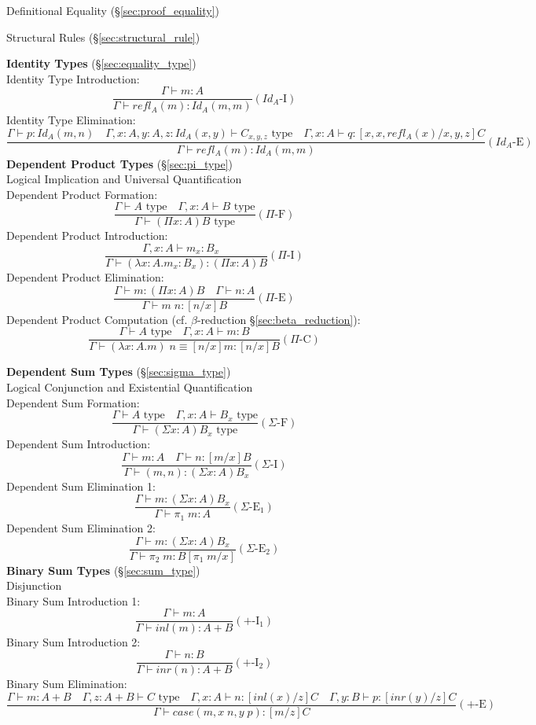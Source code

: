 Definitional Equality (\S\ref{sec:proof_equality})

Structural Rules (\S\ref{sec:structural_rule})



\textbf{Identity Types} (\S\ref{sec:equality_type})
\\
Identity Type Introduction:
\[
  \frac{
    \Gamma \vdash m : A
  }{
    \Gamma \vdash refl_A(m) : Id_A(m,m)
  } (Id_A\text{-I})
\]
Identity Type Elimination:
\[
  \frac{
    \Gamma \vdash p : Id_A (m,n) \quad
    \Gamma, x:A, y:A, z : Id_A(x,y) \vdash C_{x,y,z} \text{ type}\quad
    \Gamma, x : A \vdash q : [x, x, refl_A(x)/x,y,z]C
  }{
    \Gamma \vdash refl_A(m) : Id_A(m,m)
  } (Id_A\text{-E})
\]
\textbf{Dependent Product Types} (\S\ref{sec:pi_type})
\\
Logical Implication and Universal Quantification
\\
Dependent Product Formation:
\[
  \frac{
    \Gamma \vdash A \text{ type} \quad
    \Gamma, x:A \vdash B \text{ type}
  }{
    \Gamma \vdash (\Pi x:A) B \text{ type}
  } (\Pi\text{-F})
\]
Dependent Product Introduction:
\[
  \frac{
    \Gamma, x : A \vdash m_x : B_x \quad
  }{
    \Gamma \vdash (\lambda x:A.m_x : B_x) : (\Pi x:A) B
  } (\Pi\text{-I})
\]
Dependent Product Elimination:
\[
  \frac{
    \Gamma \vdash m : (\Pi x:A) B \quad
    \Gamma \vdash n : A
  }{
    \Gamma \vdash m\;n : [n/x]B
  } (\Pi\text{-E})
\]
Dependent Product Computation (cf. $\beta$-reduction
\S\ref{sec:beta_reduction}):
\[
  \frac{
    \Gamma \vdash A \text{ type} \quad
    \Gamma , x : A \vdash m : B
  }{
    \Gamma \vdash (\lambda x : A.m)\;n \equiv [n/x]m : [n/x]B
  } (\Pi\text{-C})
\]


\textbf{Dependent Sum Types} (\S\ref{sec:sigma_type})
\\
Logical Conjunction and Existential Quantification
\\
Dependent Sum Formation:
\[
  \frac{
    \Gamma \vdash A \text{ type} \quad
    \Gamma, x : A \vdash B_x \text{ type}
  }{
    \Gamma \vdash (\Sigma x:A) B_x \text{ type}
  } (\Sigma\text{-F})
\]
Dependent Sum Introduction:
\[
  \frac{
    \Gamma \vdash m : A \quad
    \Gamma \vdash n : [m/x]B
  }{
    \Gamma \vdash (m,n) : (\Sigma x:A) B_x
  } (\Sigma\text{-I})
\]
Dependent Sum Elimination 1:
\[
  \frac{
    \Gamma \vdash m : (\Sigma x:A) B_x
  }{
    \Gamma \vdash \pi_1\;m : A
  } (\Sigma\text{-E$_1$})
\]
Dependent Sum Elimination 2:
\[
  \frac{
    \Gamma \vdash m : (\Sigma x:A) B_x
  }{
    \Gamma \vdash \pi_2\;m : B[\pi_1\;m/x]
  } (\Sigma\text{-E$_2$})
\]
\textbf{Binary Sum Types} (\S\ref{sec:sum_type})
\\
Disjunction
\\
Binary Sum Introduction 1:
\[
  \frac{
    \Gamma \vdash m : A
  }{
    \Gamma \vdash inl(m) : A + B
  } (+\text{-I}_1)
\]
Binary Sum Introduction 2:
\[
  \frac{
    \Gamma \vdash n : B
  }{
    \Gamma \vdash inr(n) : A + B
  } (+\text{-I}_2)
\]
Binary Sum Elimination:
\[
  \frac{
    \Gamma \vdash m : A + B \quad
    \Gamma, z : A + B \vdash C \text{ type} \quad
    \Gamma, x : A \vdash n : [inl(x)/z]C \quad
    \Gamma, y : B \vdash p : [inr(y)/z]C
  }{
    \Gamma \vdash case (m, x\;n, y\;p) : [m/z]C
  } (+\text{-E})
\]



